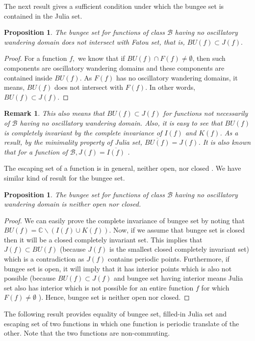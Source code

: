 \documentclass[a4paper,12pt]{amsart}
\numberwithin{equation}{section}
\newtheorem{proposition}[theorem]{Proposition}
\newtheorem{remark}[theorem]{Remark}
\begin{document}
The next result gives a sufficient condition under which the bungee set is contained in the Julia set.
\begin{proposition}
The bungee set for functions of class $\mathcal{B}$ having no oscillatory wandering domain does not intersect with Fatou set, that is, $BU(f)\subset J(f).$ 
\end{proposition}
\begin{proof}
 For a function $f,$ we know that if $BU(f)\cap F(f)\not = \emptyset $, then such components are  oscillatory wandering domains \cite{osb2} and these components are contained inside $BU(f)$. As $F(f)$ has no oscillatory wandering domains, it means, $BU(f)$ does not intersect with $F(f)$. In other words, $BU(f)\subset J(f).$ 
\end{proof}
\begin{remark} \noindent This also means that $BU(f) \subset J(f)$  for functions not necessarily of $\mathcal{B}$ having no oscillatory wandering domain. Also, it is easy to see that $BU(f)$ is completely invariant by the complete invariance of $I(f)$ and $K(f)$. As a result, by the minimality property of Julia set, $\overline{BU(f)}=J(f)$. It is also known that for a function of $\mathcal{B}, J(f)=\overline{I(f)}$ \cite{EL}.
\end{remark}
\noindent The escaping set of a function is in general, neither open, nor closed \cite{e1}. We have similar kind of result for the bungee set.
\begin{proposition}\label{Bug_nop_nclo}
The bungee set for functions of class $\mathcal{B}$ having no oscillatory wandering domain is neither open nor closed. 
\end{proposition}
\begin{proof}
We can easily prove  the complete invariance of bungee set by noting that $BU(f)= \mathbb{C} \backslash (I(f) \cup K(f))$. Now, if we assume that bungee set is  closed then it will be a closed completely invariant set. This implies that $J(f) \subset BU(f)$ (because $J(f)$ is the smallest closed completely invariant set) which is a contradiction as $J(f)$ contains periodic points. Furthermore, if bungee set is open, it will imply that it has interior points which is also not possible (because $BU(f)\subset J(f)$ and bungee set having interior  means Julia set also has interior which is not possible for an entire function $f$ for which $F(f)\neq\emptyset$ \cite{beardon}). Hence, bungee set is neither open nor closed.
\end{proof}
The following result provides equality of bungee set, filled-in Julia set and escaping set of two functions in which one function is periodic translate of the other. Note that the two functions are non-commuting.
\end{document}
